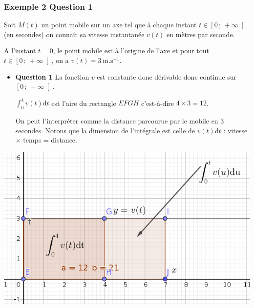 \documentclass[11pt, hyperref={urlcolor=red,%
            linkcolor=blue, %
            colorlinks=true}]{beamer}
\newcommand{\Interfo}[2]{\left[#1\, ;\, #2\right[}
\newcommand{\dt}{\ensuremath{\text{d}t}}		%
\begin{document}
\begin{frame}
\frametitle{Exemple 2 Question 1}
\label{exemple2}

Soit $M(t)$ un point mobile sur un axe tel que à chaque instant $t \in \Interfo{0}{+\infty}$ (en secondes)  on conna\^it sa vitesse instantanée $v(t)$ en mètres par seconde. 

A l'instant $t=0$, le point mobile est à l'origine de l'axe  et pour tout $t \in \Interfo{0}{+\infty}$, on a $v(t)=3 \ \text{m}.\text{s}^{-1}$.

\begin{itemize}

\item \textbf{Question 1}  La fonction $v$ est constante donc dérivable donc continue sur $\Interfo{0}{+\infty}$.

$\int_{0}^{4}v(t)\dt$  est l'aire du rectangle $EFGH$ c'est-à-dire $4 \times 3 = 12$.

On peut l'interpréter comme la distance parcourue par le mobile en $3$ secondes. Notons que la dimension de l'intégrale est celle de $v(t)\dt$ : vitesse $\times$ temps = distance.
\end{itemize}

\begin{center}
\includegraphics[scale=0.2]{images/exemple2.png}
\end{center}

\end{frame}
\end{document}
